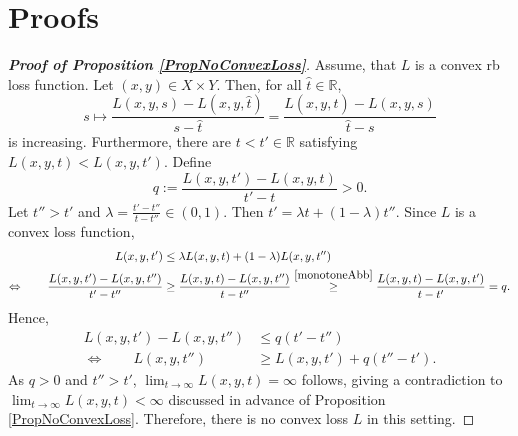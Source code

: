 \documentclass[10pt]{article}
\newcommand{\R}{\mathbb{R}}
\newcommand{\XY}{X \times Y}
\begin{document}
\printbibliography[heading = bibintoc, title={Bibliography}] 
\appendix
\section{Proofs}
\begin{proof}[\upshape \textbf{Proof of Proposition \ref{PropNoConvexLoss}}]
	Assume, that $L$ is a convex rb loss function.
	Let $(x,y) \in \XY$.
	Then, for all $\hat{t} \in \R$,
	\begin{equation} \label{monotoneAbb}
		s \mapsto \frac{L(x,y,s)-L(x,y,\hat{t})}{s-\hat{t}} = \frac{L(x,y,\hat{t})-L(x,y,s)}{\hat{t}-s}
	\end{equation}
	is increasing.
	Furthermore, there are $t < t' \in \R$ satisfying $L(x,y,t) < L(x,y,t')$.
	Define 
	\begin{equation*}
		q := \frac{L(x,y,t')-L(x,y,t)}{t'-t} > 0.
	\end{equation*}
	Let $t'' > t'$ and $\lambda = \frac{t'-t''}{t-t''} \in (0,1)$. Then $t' = \lambda t + (1-\lambda)t''$.
	Since $L$ is a convex loss function,  
	\begin{align*}
		L(x,y,t') &\leq \lambda L(x,y,t) + (1-\lambda) L(x,y,t'') \\
		\Leftrightarrow  \qquad \frac{L(x,y,t')-L(x,y,t'')}{t'-t''} &\geq \frac{L(x,y,t)-L(x,y,t'')}{t-t''} \overset{\eqref{monotoneAbb}}{\geq} \frac{L(x,y,t)-L(x,y,t')}{t-t'} = q.
	\end{align*}
	Hence,
	\begin{align*}
		L(x,y,t')-L(x,y,t'') &\leq q(t'-t'') \\
		\Leftrightarrow \qquad L(x,y,t'') &\geq L(x,y,t')+q(t''-t').
	\end{align*}
	As $q > 0$ and $t'' > t'$, $\lim_{t \to \infty} L(x,y,t) = \infty$ follows, giving a contradiction to $\lim_{t \to \infty} L(x,y,t) < \infty$ discussed in advance of Proposition \ref{PropNoConvexLoss}.
	Therefore, there is no convex loss $L$ in this setting.
\end{proof}
\end{document}
